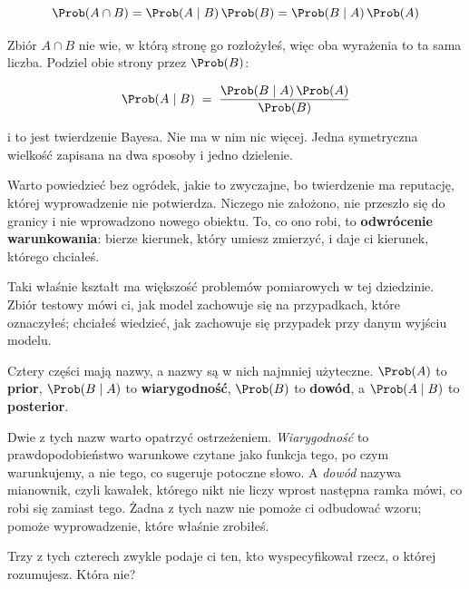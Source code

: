 \begin{fr}
\begin{ansblock}
\[ \Prob(A \cap B) = \Prob(A \mid B)\,\Prob(B)
   = \Prob(B \mid A)\,\Prob(A) \]
\end{ansblock}

Zbiór $A \cap B$ nie wie, w którą stronę go rozłożyłeś, więc oba wyrażenia to
ta sama liczba. Podziel obie strony przez $\Prob(B)$:

\[ \Prob(A \mid B) \;=\; \frac{\Prob(B \mid A)\,\Prob(A)}{\Prob(B)} \]

i to jest twierdzenie Bayesa. Nie ma w nim nic więcej. Jedna symetryczna
wielkość zapisana na dwa sposoby i jedno dzielenie.
\end{fr}

\begin{fr}
Warto powiedzieć bez ogródek, jakie to zwyczajne, bo twierdzenie ma reputację,
której wyprowadzenie nie potwierdza. Niczego nie założono, nie przeszło się do
granicy i nie wprowadzono nowego obiektu. To, co ono robi, to
\textbf{odwrócenie warunkowania}: bierze kierunek, który umiesz zmierzyć, i
daje ci kierunek, którego chciałeś.

Taki właśnie kształt ma większość problemów pomiarowych w tej dziedzinie.
Zbiór testowy mówi ci, jak model zachowuje się na przypadkach, które
oznaczyłeś; chciałeś wiedzieć, jak zachowuje się przypadek przy danym wyjściu
modelu.
\end{fr}

\begin{fr}
Cztery części mają nazwy, a nazwy są w nich najmniej użyteczne. $\Prob(A)$ to
\textbf{prior}, $\Prob(B \mid A)$ to \textbf{wiarygodność}, $\Prob(B)$ to
\textbf{dowód}, a $\Prob(A \mid B)$ to \textbf{posterior}.

\begin{note}
Dwie z tych nazw warto opatrzyć ostrzeżeniem. \emph{Wiarygodność} to
prawdopodobieństwo warunkowe czytane jako funkcja tego, po czym warunkujemy, a
nie tego, co sugeruje potoczne słowo. A \emph{dowód} nazywa mianownik, czyli
kawałek, którego nikt nie liczy wprost \dash{} następna ramka mówi, co robi
się zamiast tego. Żadna z tych nazw nie pomoże ci odbudować wzoru; pomoże
wyprowadzenie, które właśnie zrobiłeś.
\end{note}

Trzy z tych czterech zwykle podaje ci ten, kto wyspecyfikował rzecz, o której
rozumujesz. Która nie?
\dotline
\nextframe
\end{fr}


